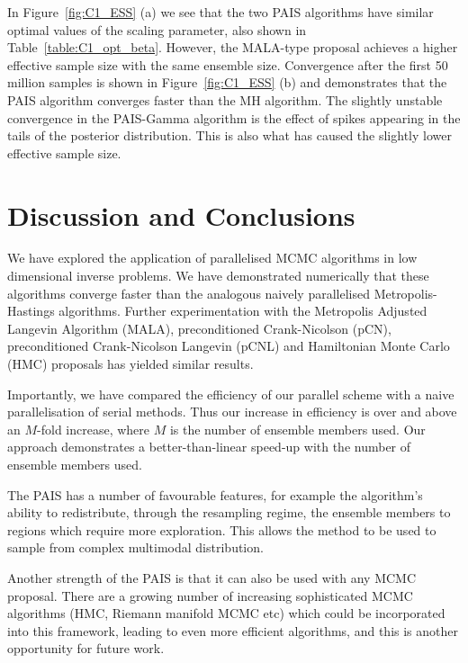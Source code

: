 \documentclass[final]{siamltex}
\begin{document}
In Figure~\ref{fig:C1_ESS} (a) we see that the two PAIS algorithms have similar optimal values of the scaling parameter, also shown in Table~\ref{table:C1_opt_beta}. However, the MALA-type proposal achieves a higher effective sample size with the same ensemble size. Convergence after the first 50 million samples is shown in Figure~\ref{fig:C1_ESS} (b) and demonstrates that the PAIS algorithm converges faster than the MH algorithm. The slightly unstable convergence in the PAIS-Gamma algorithm is the effect of spikes appearing in the tails of the posterior distribution. This is also what has caused the slightly lower effective sample size.

\section{Discussion and Conclusions}\label{Sec:Conc} 

We have explored the application of parallelised MCMC algorithms in
low dimensional inverse problems. We have demonstrated numerically
that these algorithms converge faster than the analogous naively parallelised
Metropolis-Hastings algorithms. Further experimentation with the Metropolis
Adjusted Langevin Algorithm (MALA), preconditioned Crank-Nicolson (pCN),
preconditioned Crank-Nicolson Langevin (pCNL) and Hamiltonian
Monte Carlo (HMC) proposals has yielded similar results\cite{Paul}.

Importantly, we have compared the efficiency of our parallel scheme
with a naive parallelisation of serial methods. Thus our increase in
efficiency is over and above an $M$-fold increase, where $M$ is the
number of ensemble members used. Our approach
demonstrates a better-than-linear speed-up with the number of ensemble
members used. 

The PAIS has a number of favourable features, for example the
algorithm's ability to redistribute, through the resampling regime,
the ensemble members to regions which require more exploration. This allows the
method to be used to sample from complex multimodal distribution.

Another strength of the PAIS is that it can also be used with any MCMC
proposal. There are a growing number of increasing sophisticated MCMC
algorithms (HMC, Riemann manifold MCMC etc) which could be
incorporated into this framework, leading to even more efficient
algorithms, and this is another opportunity for future work. 

\end{document}
